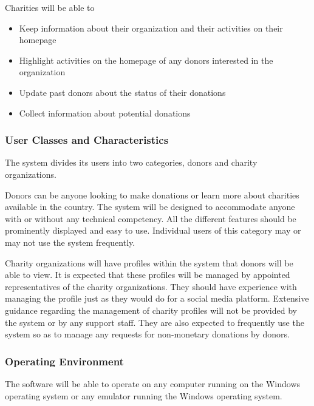 \documentclass{scrreprt}
\begin{document}
                Charities will be able to
    
                \begin{itemize}
                    \item Keep information about their organization and their activities on their homepage
                    \item Highlight activities on the homepage of any donors interested in the organization
                    \item Update past donors about the status of their donations
                    \item Collect information about potential donations
                \end{itemize}

            \subsubsection{User Classes and Characteristics}
    
                The system divides its users into two categories, donors and charity organizations.\par
    
                Donors can be anyone looking to make donations or learn more about charities available in the country. The system will be designed to accommodate anyone with or without any technical competency. All the different features should be prominently displayed and easy to use. Individual users of this category may or may not use the system frequently.\par
    
                Charity organizations will have profiles within the system that donors will be able to view. It is expected that these profiles will be managed by appointed representatives of the charity organizations. They should have experience with managing the profile just as they would do for a social media platform. Extensive guidance regarding the management of charity profiles will not be provided by the system or by any support staff. They are also expected to frequently use the system so as to manage any requests for non-monetary donations by donors.
    
            \subsubsection{Operating Environment}
    
                The software will be able to operate on any computer running on the Windows operating system or any emulator running the Windows operating system.
\end{document}
